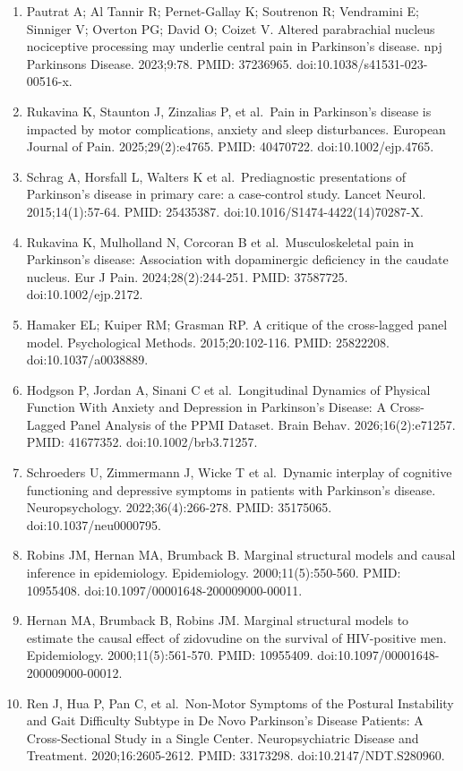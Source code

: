 \documentclass[
  english,
  12pt,
]{article}
\begin{document}
\begin{enumerate}
\item
  Pautrat A; Al Tannir R; Pernet-Gallay K; Soutrenon R; Vendramini E; Sinniger V; Overton PG; David O; Coizet V. Altered parabrachial nucleus nociceptive processing may underlie central pain in Parkinson's disease. npj Parkinsons Disease. 2023;9:78. PMID: 37236965. doi:10.1038/s41531-023-00516-x.
\item
  Rukavina K, Staunton J, Zinzalias P, et al.~Pain in Parkinson's disease is impacted by motor complications, anxiety and sleep disturbances. European Journal of Pain. 2025;29(2):e4765. PMID: 40470722. doi:10.1002/ejp.4765.
\item
  Schrag A, Horsfall L, Walters K et al.~Prediagnostic presentations of Parkinson's disease in primary care: a case-control study. Lancet Neurol. 2015;14(1):57-64. PMID: 25435387. doi:10.1016/S1474-4422(14)70287-X.
\item
  Rukavina K, Mulholland N, Corcoran B et al.~Musculoskeletal pain in Parkinson's disease: Association with dopaminergic deficiency in the caudate nucleus. Eur J Pain. 2024;28(2):244-251. PMID: 37587725. doi:10.1002/ejp.2172.
\item
  Hamaker EL; Kuiper RM; Grasman RP. A critique of the cross-lagged panel model. Psychological Methods. 2015;20:102-116. PMID: 25822208. doi:10.1037/a0038889.
\item
  Hodgson P, Jordan A, Sinani C et al.~Longitudinal Dynamics of Physical Function With Anxiety and Depression in Parkinson's Disease: A Cross-Lagged Panel Analysis of the PPMI Dataset. Brain Behav. 2026;16(2):e71257. PMID: 41677352. doi:10.1002/brb3.71257.
\item
  Schroeders U, Zimmermann J, Wicke T et al.~Dynamic interplay of cognitive functioning and depressive symptoms in patients with Parkinson's disease. Neuropsychology. 2022;36(4):266-278. PMID: 35175065. doi:10.1037/neu0000795.
\item
  Robins JM, Hernan MA, Brumback B. Marginal structural models and causal inference in epidemiology. Epidemiology. 2000;11(5):550-560. PMID: 10955408. doi:10.1097/00001648-200009000-00011.
\item
  Hernan MA, Brumback B, Robins JM. Marginal structural models to estimate the causal effect of zidovudine on the survival of HIV-positive men. Epidemiology. 2000;11(5):561-570. PMID: 10955409. doi:10.1097/00001648-200009000-00012.
\item
  Ren J, Hua P, Pan C, et al.~Non-Motor Symptoms of the Postural Instability and Gait Difficulty Subtype in De Novo Parkinson's Disease Patients: A Cross-Sectional Study in a Single Center. Neuropsychiatric Disease and Treatment. 2020;16:2605-2612. PMID: 33173298. doi:10.2147/NDT.S280960.

\end{enumerate}
\end{document}
